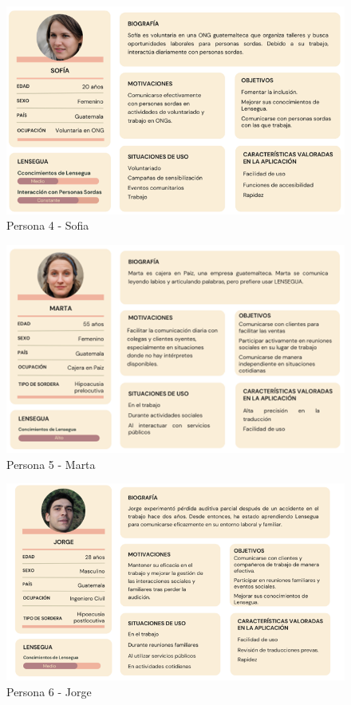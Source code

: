 \begin{figure} [H]
    \centering
    \includegraphics[width=0.8\linewidth]{figuras/sofia_persona.png}
    \caption{Persona 4 - Sofia}
    \label{fig:enter-label}
\end{figure}

\begin{figure}[H]
    \centering
    \includegraphics[width=0.8\linewidth]{figuras/marta_persona.png}
    \caption{Persona 5 - Marta}
    \label{fig:enter-label}
\end{figure}

\begin{figure} [H]
    \centering
    \includegraphics[width=0.8\linewidth]{figuras/jorge_persona.png}
    \caption{Persona 6 - Jorge}
    \label{fig:enter-label}
\end{figure}

